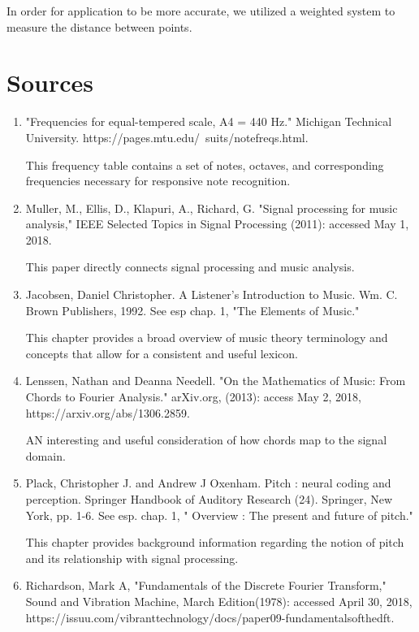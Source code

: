 \documentclass{article}
\begin{document}
In order for application to be more accurate, we utilized a weighted system to measure the distance between points. 

\section{Sources}
\begin{enumerate}
\item "Frequencies for equal-tempered scale, A4 = 440 Hz." Michigan Technical University. \newline https://pages.mtu.edu/~suits/notefreqs.html.

This frequency table contains a set of notes, octaves, and corresponding frequencies necessary for responsive note recognition.

\item Muller, M., Ellis, D., Klapuri, A., Richard, G. "Signal processing for music analysis," IEEE Selected Topics in Signal Processing (2011): accessed May 1, 2018.

This paper directly connects signal processing and music analysis.

\item Jacobsen, Daniel Christopher. A Listener's Introduction to Music. Wm. C. Brown Publishers, 1992. See esp chap. 1, "The Elements of Music."

This chapter provides a broad overview of music theory terminology and concepts that allow for a consistent and useful lexicon.

\item Lenssen, Nathan and Deanna Needell. "On the Mathematics of Music: From Chords to Fourier Analysis." arXiv.org, (2013): access May 2, 2018, https://arxiv.org/abs/1306.2859. 

AN interesting and useful consideration of how chords map to the signal domain.

\item Plack, Christopher J. and Andrew J Oxenham. Pitch : neural coding and perception. Springer Handbook of Auditory Research (24). Springer, New York, pp. 1-6. See esp. chap. 1, " Overview : The present and future of pitch."

This chapter provides background information regarding the notion of pitch and its relationship with signal processing.


\item Richardson, Mark A, "Fundamentals of the Discrete Fourier Transform," Sound and Vibration Machine, March Edition(1978): accessed April 30, 2018,  https://issuu.com/vibranttechnology/docs/paper09-fundamentalsofthedft.


\end{enumerate}
\end{document}

